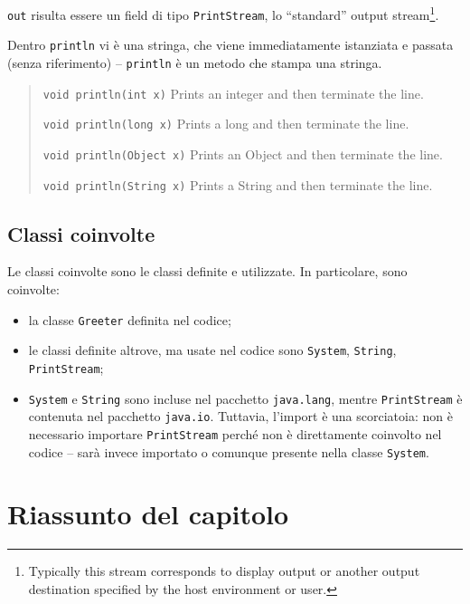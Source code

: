 \documentclass[\fontsizeclass,twocolumn]{\classname}
\theoremstyle{definition}
\theoremstyle{definition}
\begin{document}
\texttt{out} risulta essere un field di tipo \texttt{PrintStream}, lo
``standard'' output stream\footnote{Typically this stream corresponds to
display output or another output destination specified by the host environment
or user.}.


Dentro \texttt{println} vi è una stringa, che viene immediatamente istanziata e
passata (senza riferimento) \--- \texttt{println} è un metodo che stampa una
stringa.


\begin{quote}
    \footnotesize{\texttt{void 	println(int x)} 	Prints an integer and then terminate the line.

    \texttt{void 	println(long x)} 	Prints a long and then terminate the line.

    \texttt{void 	println(Object x)} 	Prints an Object and then terminate the line.

    \texttt{void 	println(String x)} 	Prints a String and then terminate the line.
    }
\end{quote}

\subsection{Classi coinvolte}

Le classi coinvolte sono le classi definite e utilizzate. In particolare, sono coinvolte:
\begin{itemize}
    \item la classe \texttt{Greeter} definita nel codice;
    \item le classi definite altrove, ma usate nel codice sono \texttt{System},
        \texttt{String}, \texttt{PrintStream};
    \item \texttt{System} e \texttt{String} sono incluse nel pacchetto
        \texttt{java.lang}, mentre \texttt{PrintStream} è contenuta nel
        pacchetto \texttt{java.io}. Tuttavia, l'import è una scorciatoia: non è
        necessario importare \texttt{PrintStream} perché non è direttamente
        coinvolto nel codice \--- sarà invece importato o comunque presente
        nella classe \texttt{System}.
\end{itemize}

\section{Riassunto del capitolo}
\end{document}
